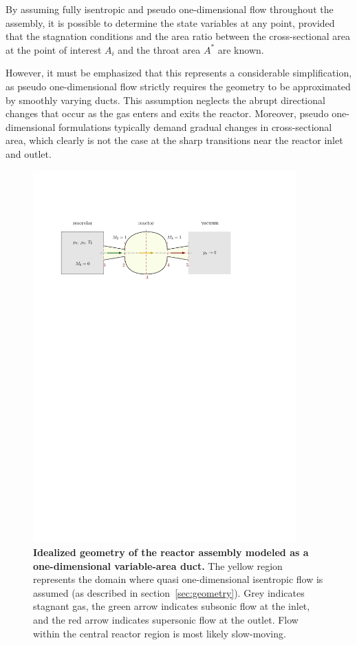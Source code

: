 By assuming fully isentropic and pseudo one-dimensional flow throughout the assembly, it is possible to determine the state variables at any point, provided that the stagnation conditions and the area ratio between the cross-sectional area at the point of interest $A_i$ and the throat area $A^*$ are known.

However, it must be emphasized that this represents a considerable simplification, as pseudo one-dimensional flow strictly requires the geometry to be approximated by smoothly varying ducts.
This assumption neglects the abrupt directional changes that occur as the gas enters and exits the reactor.
Moreover, pseudo one-dimensional formulations typically demand gradual changes in cross-sectional area, which clearly is not the case at the sharp transitions near the reactor inlet and outlet.
\cite{anderson2021modern}

\begin{figure}[H]
    \centering
    \includegraphics[width=0.9\textwidth]{src/03_analytical-work/fig_1d-flow-geometry}
    \caption[Idealized geometry of the reactor assembly modeled as a one-dimensional variable-area duct.]{
        \textbf{Idealized geometry of the reactor assembly modeled as a one-dimensional variable-area duct.}
        The yellow region represents the domain where quasi one-dimensional isentropic flow is assumed (as described in section~\ref{sec:geometry}).
        Grey indicates stagnant gas, the green arrow indicates subsonic flow at the inlet, and the red arrow indicates supersonic flow at the outlet.
        Flow within the central reactor region is most likely slow-moving.
    }
\end{figure}

